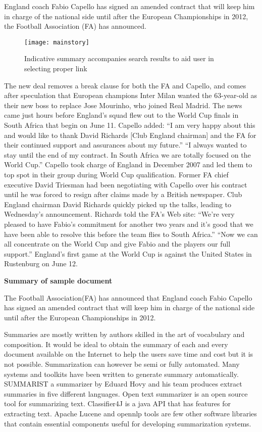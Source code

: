 \textsf{England coach Fabio Capello has signed an amended contract that will 
keep him in charge of the national side until after the European Championships 
in 2012,
the Football Association (FA) has announced.}
\begin{figure}[h]
 
\texttt{[image: mainstory]}
 \caption{\singlespace Indicative summary accompanies search results to aid 
user in selecting proper link}
\end{figure}
\textsf{The new deal removes a break clause for both the FA and Capello, and 
comes after speculation that European
champions Inter Milan wanted the 63-year-old as their new boss to replace Jose 
Mourinho, who joined Real Madrid. The news came just hours before England's 
squad flew out to the World Cup finals in South Africa that begin on June 11. 
Capello added: ``I am very happy about this and would like to thank David 
Richards
[Club England chairman] and the FA for their continued support and assurances 
about my future.''
``I always wanted to stay until the end of my contract. In South Africa we are 
totally focused on the World Cup.''
Capello took charge of England in December 2007 and led them to top spot in 
their group during World Cup qualification.
Former FA chief executive David Triesman had been negotiating with Capello over 
his contract until he was forced to resign after claims made by a British 
newspaper.
Club England chairman David Richards quickly picked up the talks, leading to 
Wednesday's announcement.
Richards told the FA's Web site: ``We're very pleased to have Fabio's 
commitment for another two years and it's good that we have been able to 
resolve 
this before the team flies to South Africa.''
``Now we can all concentrate on the World Cup and give Fabio and the players 
our full support.''
England's first game at the World Cup is against the United States in 
Rustenburg on June 12.}

\textbf{Summary of sample document}

\textsf{The Football Association(FA) has announced that England coach Fabio 
Capello has signed an amended contract that will keep him in charge of the 
national side until after the European Championships in 2012.}

Summaries are mostly written by authors skilled in the art of vocabulary and 
composition. It would be ideal to obtain the summary of each and every document 
available 
on the Internet to help the users save time and cost but it is not possible. 
Summarization can however be semi or fully automated. Many systems and toolkits 
have been 
written to generate summary automatically. SUMMARIST a summarizer by Eduard 
Hovy and his team produces extract summaries in five different languages. Open 
text summarizer
is an open source tool for summarizing text. Classifier4J is a java API that 
has features for extracting text. Apache Lucene and opennlp tools are few other 
software 
libraries that contain essential components useful for developing summarization 
systems. 
